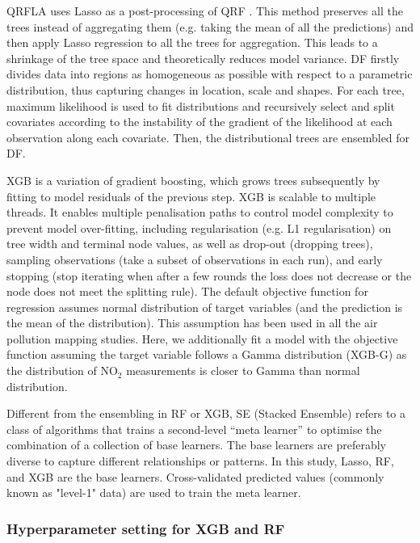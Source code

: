 \documentclass{article}
\begin{document}
QRFLA uses Lasso as a post-processing of QRF \citep[][page 617]{hastie2017elements}. This method preserves all the trees instead of aggregating them (e.g. taking the mean of all the predictions) and then apply Lasso regression to all the trees for aggregation. This leads to a shrinkage of the tree space and theoretically reduces model variance. DF \citep{schlosser2019distributional} firstly divides data into regions as homogeneous as possible with respect to a parametric distribution, thus capturing changes in location, scale and shapes. For each tree, maximum likelihood is used to fit distributions and recursively select and split covariates according to the instability of the gradient of the likelihood at each observation along each covariate. Then, the distributional trees are ensembled for DF.

XGB is a variation of gradient boosting, which grows trees subsequently by fitting to model residuals of the previous step. XGB is scalable to multiple threads. It enables multiple penalisation paths to control model complexity to prevent model over-fitting, including regularisation (e.g. L1 regularisation) on tree width and terminal node values, as well as drop-out (dropping trees), sampling observations (take a subset of observations in each run), and early stopping (stop iterating when after a few rounds the loss does not decrease or the node does not meet the splitting rule). The default objective function for regression assumes normal distribution of target variables (and the prediction is the mean of the distribution). This assumption has been used in all the air pollution mapping studies. Here, we additionally fit a model with the objective function assuming the target variable follows a Gamma distribution (XGB-G) as the distribution of NO$_2$ measurements is closer to Gamma than normal distribution.  

Different from the ensembling in RF or XGB, SE (Stacked Ensemble) refers to a class of algorithms that trains a second-level “meta learner” to optimise the combination of a collection of base learners. The base learners are preferably diverse to capture different relationships or patterns. In this study, Lasso, RF, and XGB are the base learners. Cross-validated predicted values (commonly known as "level-1" data) are used to train the meta learner.  


\subsubsection{Hyperparameter setting for XGB and RF}
\label{sec:hp}
\end{document}
